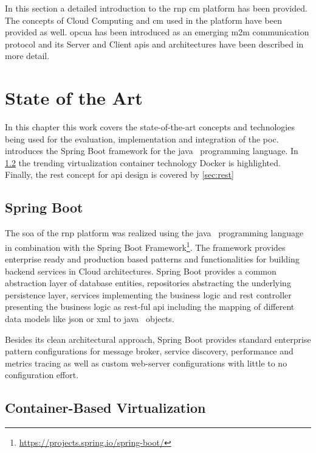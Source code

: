 \documentclass[
a4paper,
twoside,
headsepline,
cleardoublepage=empty,
parskip=half,
draft=false
]{scrbook}
\begin{document}
			In this section a detailed introduction to the \gls{rnp} \gls{cm} platform has been provided. 
			The concepts of Cloud Computing and \gls{cm} used in the platform have been provided as well. 
			\gls{opcua} has been introduced as an emerging \gls{m2m} communication protocol and its Server and Client \gls{api}s and architectures have been described in more detail. 		

	\chapter{State of the Art}\label{ch:state_of_the_art}
	
		In this chapter this work covers the state-of-the-art concepts and technologies being used for the evaluation, implementation and integration of the \gls{poc}.  introduces the Spring Boot framework for the \gls{java}~\cite{java2015} programming language. In \cref{sec:docker} the trending virtualization container technology Docker is highlighted. Finally, the \gls{rest} concept for \gls{api} design is covered by \cref{sec:rest}

		\section{Spring Boot}\label{sec:spring_boot}

			The \gls{soa} of the \gls{rnp} platform was realized using the \gls{java}~\cite{java2015} programming language in combination with the Spring Boot Framework\footnote{\url{https://projects.spring.io/spring-boot/}}. The framework provides enterprise ready and production based patterns and functionalities for building backend services in Cloud architectures. Spring Boot provides a common abstraction layer of database entities, repositories abstracting the underlying persistence layer, services implementing the business logic and \gls{rest} controller presenting the business logic as \gls{rest}-ful \gls{api} including the mapping of different data models like \gls{json} or \gls{xml} to \gls{java}~\cite{java2015} objects.
			
			Besides its clean architectural approach, Spring Boot provides standard enterprise pattern configurations for message broker, service discovery, performance and metrics tracing as well as custom web-server configurations with little to no configuration effort.

		\section{Container-Based Virtualization}\label{sec:docker}
		
\end{document}

